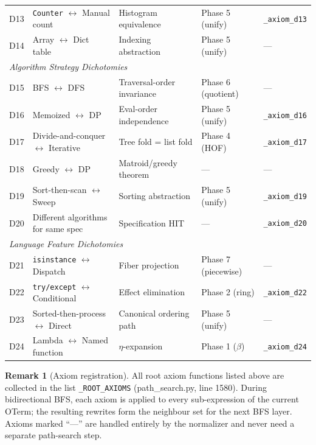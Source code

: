 \documentclass[11pt,a4paper]{report}
\theoremstyle{definition}
\newtheorem{remark}[definition]{Remark}
\theoremstyle{plain}
\begin{document}
\begin{longtable}{r p{3.5cm} p{3.5cm} p{3.0cm} p{2.2cm}}
  D13 & \texttt{Counter} $\leftrightarrow$ Manual count &
    Histogram equivalence &
    Phase 5 (unify) &
    \texttt{\_axiom\_d13} \\
  D14 & Array $\leftrightarrow$ Dict table &
    Indexing abstraction &
    Phase 5 (unify) &
    --- \\
  \midrule
  \multicolumn{5}{l}{\emph{Algorithm Strategy Dichotomies}} \\
  \midrule
  D15 & BFS $\leftrightarrow$ DFS &
    Traversal-order invariance &
    Phase 6 (quotient) &
    --- \\
  D16 & Memoized $\leftrightarrow$ DP &
    Eval-order independence &
    Phase 5 (unify) &
    \texttt{\_axiom\_d16} \\
  D17 & Divide-and-conquer $\leftrightarrow$ Iterative &
    Tree fold = list fold &
    Phase 4 (HOF) &
    \texttt{\_axiom\_d17} \\
  D18 & Greedy $\leftrightarrow$ DP &
    Matroid/greedy theorem &
    --- &
    --- \\
  D19 & Sort-then-scan $\leftrightarrow$ Sweep &
    Sorting abstraction &
    Phase 5 (unify) &
    \texttt{\_axiom\_d19} \\
  D20 & Different algorithms for same spec &
    Specification HIT &
    --- &
    \texttt{\_axiom\_d20} \\
  \midrule
  \multicolumn{5}{l}{\emph{Language Feature Dichotomies}} \\
  \midrule
  D21 & \texttt{isinstance} $\leftrightarrow$ Dispatch &
    Fiber projection &
    Phase 7 (piecewise) &
    --- \\
  D22 & \texttt{try/except} $\leftrightarrow$ Conditional &
    Effect elimination &
    Phase 2 (ring) &
    \texttt{\_axiom\_d22} \\
  D23 & Sorted-then-process $\leftrightarrow$ Direct &
    Canonical ordering path &
    Phase 5 (unify) &
    --- \\
  D24 & Lambda $\leftrightarrow$ Named function &
    $\eta$-expansion &
    Phase 1 ($\beta$) &
    \texttt{\_axiom\_d24} \\
  \bottomrule
\end{longtable}

\begin{remark}[Axiom registration]
All root axiom functions listed above are collected in the list
\texttt{\_ROOT\_AXIOMS} (path\_search.py, line 1580).
During bidirectional BFS, each axiom is applied to every sub-expression
of the current OTerm; the resulting rewrites form the neighbour set
for the next BFS layer.  Axioms marked ``---'' are handled entirely
by the normalizer and never need a separate path-search step.
\end{remark}
\end{document}
